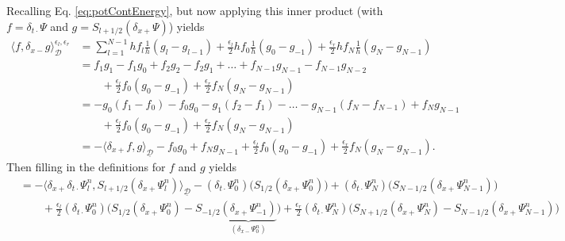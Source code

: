 \documentclass[dvipsnames]{article}
\def\dxp{\delta_{x+}}
\def\dxm{\delta_{x-}}
\def\Sp{S_{l+1/2}}
\def\Psiln{\Psi_l^n}
\def\dtd{\delta_{t\cdot}}
\begin{document}
Recalling Eq. \eqref{eq:potContEnergy}, but now applying this inner product (with $f=\dtd\Psi$ and $g = S_{l+1/2}(\dxp\Psi)$) yields
\begin{equation}
    \begin{aligned}
        \langle f,\dxm g \rangle_{\mathcal{D}}^{\epsilon_l,\epsilon_r} &= \sum_{l=1}^{N-1} h f_l\frac{1}{h}(g_l-g_{l-1}) + \frac{\epsilon_l}{2}hf_0\frac{1}{h}(g_0 - g_{-1})+ \frac{\epsilon_r}{2}hf_N\frac{1}{h}(g_N - g_{N-1})\\
        &=f_1g_1-f_1g_0+f_2g_2-f_2g_1+\hdots+f_{N-1}g_{N-1}-f_{N-1}g_{N-2}\\
        &\qquad+ \frac{\epsilon_l}{2}f_0(g_0 - g_{-1}) + \frac{\epsilon_r}{2}f_N(g_N-g_{N-1})\\
        &= -g_0(f_1-f_0) - f_0g_0 - g_1(f_2-f_1) - \hdots - g_{N-1}(f_N - f_{N-1}) + f_Ng_{N-1}\\
        &\qquad + \frac{\epsilon_l}{2}f_0(g_0 - g_{-1}) + \frac{\epsilon_r}{2}f_N(g_N-g_{N-1})\\
        &= -\langle \dxp f, g\rangle_{\underline{\mathcal{D}}} - f_0g_0 + f_Ng_{N-1}+\frac{\epsilon_l}{2}f_0(g_0 - g_{-1}) + \frac{\epsilon_r}{2}f_N(g_N-g_{N-1}).
    \end{aligned}
\end{equation}
Then filling in the definitions for $f$ and $g$ yields
\begin{equation}
    \begin{aligned}
    &= -\langle \dxp \dtd\Psiln,\Sp (\dxp\Psiln)\rangle_{\underline{\mathcal{D}}}-(\dtd\Psi_0^n)\Big(S_{1/2}(\dxp\Psi_0^n)\Big) + (\dtd\Psi_N^n)\Big(S_{N-1/2}(\dxp\Psi_{N-1}^n)\Big)\\
    & \qquad +\frac{\epsilon_l}{2}(\dtd\Psi_0^n)\Big(S_{1/2}(\dxp\Psi_0^n)-S_{-1/2}\underbrace{(\dxp\Psi_{-1}^n)}_{(\dxm\Psi_0^n)}\Big) + \frac{\epsilon_r}{2}(\dtd\Psi_{N}^n)\Big(S_{N+1/2}(\dxp\Psi_N^n) - S_{N-1/2}(\dxp \Psi_{N-1}^n)\Big)
    \end{aligned}
\end{equation}
\end{document}
